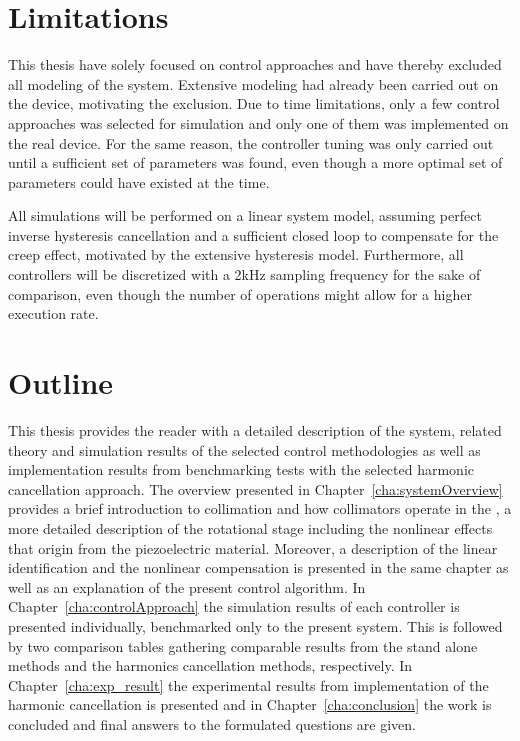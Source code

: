 \section{Limitations}
This thesis have solely focused on control approaches and have thereby excluded all modeling of the system. Extensive modeling had already been carried out on the device, motivating the exclusion. Due to time limitations, only a few control approaches was selected for simulation and only one of them was implemented on the real device. For the same reason, the controller tuning was only carried out until a sufficient set of parameters was found, even though a more optimal set of parameters could have existed at the time.

All simulations will be performed on a linear system model, assuming perfect inverse hysteresis cancellation and a sufficient closed loop to compensate for the creep effect, motivated by the extensive hysteresis model. Furthermore, all controllers will be discretized with a 2kHz sampling frequency for the sake of comparison, even though the number of operations might allow for a higher execution rate.

\section{Outline}
This thesis provides the reader with a detailed description of the system, related theory and simulation results of the selected control methodologies as well as implementation results from benchmarking tests with the selected harmonic cancellation approach. The overview presented in Chapter~\ref{cha:systemOverview} provides a brief introduction to collimation and how collimators operate in the \abbrLHC, a more detailed description of the rotational stage including the nonlinear effects that origin from the piezoelectric material. Moreover, a description of the linear identification and the nonlinear compensation is presented in the same chapter as well as an explanation of the present control algorithm. In Chapter~\ref{cha:controlApproach} the simulation results of each controller is presented individually, benchmarked only to the present system. This is followed by two comparison tables gathering comparable results from the stand alone methods and the harmonics cancellation methods, respectively. In Chapter~\ref{cha:exp_result} the experimental results from implementation of the harmonic cancellation is presented and in Chapter~\ref{cha:conclusion} the work is concluded and final answers to the formulated questions are given.
